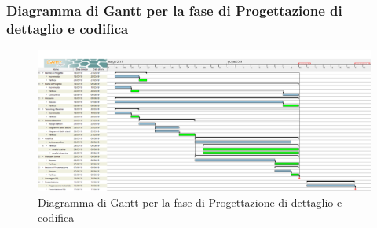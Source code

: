 \subsubsection{Diagramma di Gantt per la fase di Progettazione di dettaglio e codifica}
\begin{figure}[h!]
\begin{center}
  \includegraphics[scale=0.232]{immagini/CodificaGantt.png}
  \caption{Diagramma di Gantt per la fase di Progettazione di dettaglio e codifica}
  \end{center}
\end{figure}

\newpage

